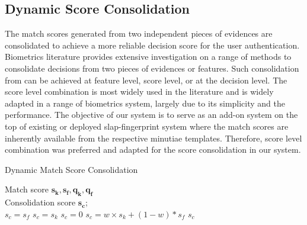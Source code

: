 \subsection{Dynamic Score Consolidation\label{dynamic-score}}

The match scores generated from two independent pieces of evidences are consolidated to achieve a more reliable decision score for the user authentication. Biometrics literature \cite{maltoni2009handbook} provides extensive investigation on a range of methods to consolidate decisions from two pieces of evidences or features. Such consolidation from can be achieved at feature level, score level, or at the decision level. The score level combination is most widely used in the literature and is widely adapted \cite{jain2012biometric} in a range of biometrics system, largely due to its simplicity and the performance. The objective of our system is to serve as an add-on system on the top of existing or deployed slap-fingerprint system where the match scores are inherently available from the respective minutiae templates. Therefore, score level combination was preferred and adapted for the score consolidation in our system.  
\begin{algorithm}[h!]
    \renewcommand{\algorithmicrequire}{\textbf{Input:}}
    \renewcommand{\algorithmicensure}{\textbf{Output:}}
    \caption{Dynamic Match Score Consolidation}
    \begin{algorithmic}[1]
        \REQUIRE Match score $\bm{s_k, s_f, q_k, q_f}$ \\ 
        \ENSURE Consolidation score $\bm{s_c}$;\\
            \STATE $s_c = s_f$
        \ENDIF
            \STATE $s_c = s_k$
        \ENDIF
            \STATE $s_c = 0$
        \ELSE
            \STATE $s_c = w \times s_k + (1-w)*s_f$
        \ENDIF
        \RETURN $s_c$
    \end{algorithmic}
    \label{algorithm-2}
\end{algorithm}

